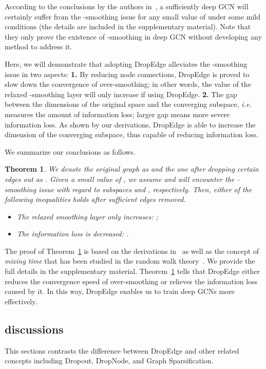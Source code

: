 \documentclass{article}
\newtheorem{theorem}{Theorem}
\begin{document}
According to the conclusions by the authors in~\citet{oono2019asymptotic}, a sufficiently deep GCN will certainly suffer from the -smoothing issue for any small value of  under some mild conditions (the details are included in the supplementary material). Note that they only prove the existence of -smoothing in deep GCN without developing any method to address it.

Here, we will demonstrate that adopting DropEdge alleviates the -smoothing issue in two aspects: \textbf{1.} By reducing node connections, DropEdge is proved to slow down the convergence of over-smoothing; in other words, the value of the relaxed -smoothing layer will only increase if using DropEdge. \textbf{2.} The gap between the dimensions of the original space and the converging subspace, \emph{i.e.}  measures the amount of information loss; larger gap means more severe information loss. As shown by our derivations, DropEdge is able to increase the dimension of the converging subspace, thus capable of reducing information loss.

We summarize our conclusions as follows.
\begin{theorem}
\label{The:smoothing}
We denote the original graph as  and the one after dropping certain edges out as . Given a small value of , we assume  and  will encounter the -smoothing issue with regard to subspaces  and , respectively. Then, either of the following inequalities holds after sufficient edges removed.
\begin{itemize}
    \item The relaxed smoothing layer only increases: ;
    \item The information loss is decreased: .
\end{itemize}
\end{theorem}

The proof of Theorem~\ref{The:smoothing} is based on the derivations in~\citet{oono2019asymptotic} as well as the concept of \emph{mixing time} that has been studied in the random walk theory~\citep{Lovasz1993}. We provide the full details in the supplementary material. Theorem~\ref{The:smoothing} tells that DropEdge either reduces the convergence speed of over-smoothing or relieves the information loss caused by it. In this way, DropEdge enables us to train deep GCNs more effectively.


\subsection{discussions}\label{sec.discussions}
This sections contrasts the difference between DropEdge and other related concepts including Dropout, DropNode, and Graph Sparsification.
\end{document}
